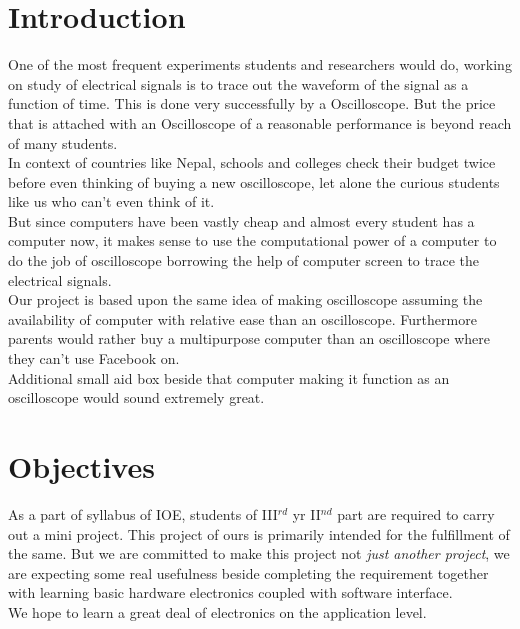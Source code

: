 \documentclass[12pt,a4paper]{article}
\begin{document}
\section{Introduction}
One of the most frequent experiments students and researchers would do, working on study of electrical signals is to trace out the waveform of the signal as a function of time. This is done very successfully by a Oscilloscope. But the price that is attached with an Oscilloscope of a reasonable performance is beyond reach of many students. \\

In context of countries like Nepal, schools and colleges check their budget twice before even thinking of buying a new oscilloscope, let alone the curious students like us who can't even think of it.\\

But since computers have been vastly cheap and almost every student has a computer now, it makes sense to use the computational power of a computer to do the job of oscilloscope borrowing the help of computer screen to trace the electrical signals.\\

Our project is based upon the same idea of making oscilloscope assuming the availability of computer with relative ease than an oscilloscope. Furthermore parents would rather buy a multipurpose computer than an oscilloscope where they can't use Facebook on.\\

Additional small aid box beside that computer making it function as an oscilloscope would sound extremely great.\\

\section{Objectives}
As a part of syllabus of IOE, students of III${}^{rd}$ yr II${}^{nd}$ part are required to carry out a mini project. This project of ours is primarily intended for the fulfillment of the same. But we are committed to make this project not \emph{just another project}, we are expecting some real usefulness beside completing the requirement together with learning basic hardware electronics coupled with software interface.\\

We hope to learn a great deal of electronics on the application level.\\
\end{document}
